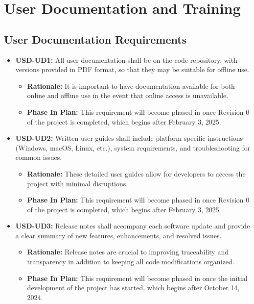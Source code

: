 \documentclass[12pt]{article}
\newcommand{\lips}{\textit{Insert your content here.}}
\begin{document}
\section{User Documentation and Training}
\subsection{User Documentation Requirements}
\begin{itemize}
  \item \label{USD-UD1} \textbf{USD-UD1:} All user documentation shall be on the code repository, with versions provided in PDF format, so that they may be suitable for offline use.
  \begin{itemize}
    \item \textbf{Rationale:} It is important to have documentation available for both online and offline use in the event that online access is unavailable.
    \item \textbf{Phase In Plan:} This requirement will become phased in once Revision 0 of the project is completed, which begins after February 3, 2025. 
  \end{itemize}
  \item \label{USD-UD2} \textbf{USD-UD2:} Written user guides shall include platform-specific instructions (Windows, macOS, Linux, etc.), system requirements, and troubleshooting for common issues.
  \begin{itemize}
    \item \textbf{Rationale:} These detailed user guides allow for developers to access the project with minimal disruptions. 
    \item \textbf{Phase In Plan:} This requirement will become phased in once Revision 0 of the project is completed, which begins after February 3, 2025.
  \end{itemize}
  \item \label{USD-UD3} \textbf{USD-UD3:} Release notes shall accompany each software update and provide a clear summary of new features, enhancements, and resolved issues.
  \begin{itemize}
    \item \textbf{Rationale:} Release notes are crucial to improving traceability and transparency in addition to keeping all code modifications organized.
    \item \textbf{Phase In Plan:} This requirement will become phased in once the initial development of the project has started, which begins after October 14, 2024. 
  \end{itemize}
\end{itemize}
\end{document}
